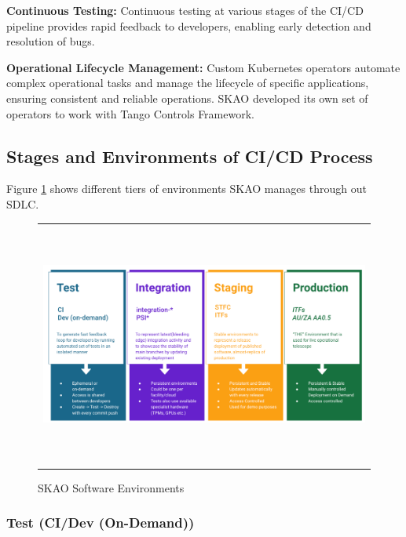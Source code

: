 \documentclass[a4paper]{spie}  %
\begin{document}
\textbf{Continuous Testing:} Continuous testing at various stages of the CI/CD pipeline provides rapid feedback to developers, enabling early detection and resolution of bugs.

\textbf{Operational Lifecycle Management: }Custom Kubernetes operators automate complex operational tasks and manage the lifecycle of specific applications, ensuring consistent and reliable operations. SKAO developed its own set of operators to work with Tango Controls Framework.\cite{controls_tango_home_2024}

\subsection{Stages and Environments of CI/CD Process}

Figure \ref{fig:envs} shows different tiers of environments SKAO manages through out SDLC.

   \begin{figure} [ht]
   \begin{center}
   \begin{tabular}{c} %
   \includegraphics[height=8cm]{envs.png}
   \end{tabular}
   \end{center}
   \caption 
   { \label{fig:envs}
SKAO Software Environments }
    \end{figure} 

\subsubsection*{Test (CI/Dev (On-Demand))}
\end{document}
